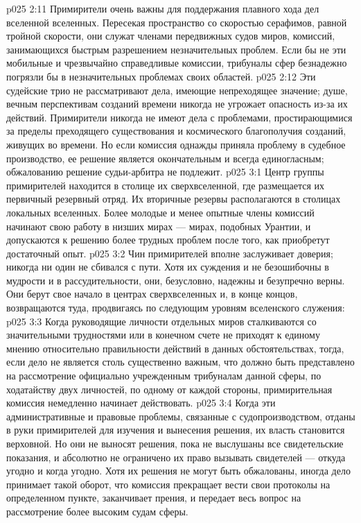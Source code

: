 \vs p025 2:11 \pc Примирители очень важны для поддержания плавного хода дел вселенной вселенных. Пересекая пространство со скоростью серафимов, равной тройной скорости, они служат членами передвижных судов миров, комиссий, занимающихся быстрым разрешением незначительных проблем. Если бы не эти мобильные и чрезвычайно справедливые комиссии, трибуналы сфер безнадежно погрязли бы в незначительных проблемах своих областей.
\vs p025 2:12 Эти судейские трио не рассматривают дела, имеющие непреходящее значение; душе, вечным перспективам созданий времени никогда не угрожает опасность из\hyp{}за их действий. Примирители никогда не имеют дела с проблемами, простирающимися за пределы преходящего существования и космического благополучия созданий, живущих во времени. Но если комиссия однажды приняла проблему в судебное производство, ее решение является окончательным и всегда единогласным; обжалованию решение судьи\hyp{}арбитра не подлежит.
\vs p025 3:1 Центр группы примирителей находится в столице их сверхвселенной, где размещается их первичный резервный отряд. Их вторичные резервы располагаются в столицах локальных вселенных. Более молодые и менее опытные члены комиссий начинают свою работу в низших мирах --- мирах, подобных Урантии, и допускаются к решению более трудных проблем после того, как приобретут достаточный опыт.
\vs p025 3:2 Чин примирителей вполне заслуживает доверия; никогда ни один не сбивался с пути. Хотя их суждения и не безошибочны в мудрости и в рассудительности, они, безусловно, надежны и безупречно верны. Они берут свое начало в центрах сверхвселенных и, в конце концов, возвращаются туда, продвигаясь по следующим уровням вселенского служения:
\vs p025 3:3 \bibnobreakspace {} Когда руководящие личности отдельных миров сталкиваются со значительными трудностями или в конечном счете не приходят к единому мнению относительно правильности действий в данных обстоятельствах, тогда, если дело не является столь существенно важным, что должно быть представлено на рассмотрение официально учрежденным трибуналам данной сферы, по ходатайству двух личностей, по одному от каждой стороны, примирительная комиссия немедленно начинает действовать.
\vs p025 3:4 Когда эти административные и правовые проблемы, связанные с судопроизводством, отданы в руки примирителей для изучения и вынесения решения, их власть становится верховной. Но они не выносят решения, пока не выслушаны все свидетельские показания, и абсолютно не ограничено их право вызывать свидетелей --- откуда угодно и когда угодно. Хотя их решения не могут быть обжалованы, иногда дело принимает такой оборот, что комиссия прекращает вести свои протоколы на определенном пункте, заканчивает прения, и передает весь вопрос на рассмотрение более высоким судам сферы.
